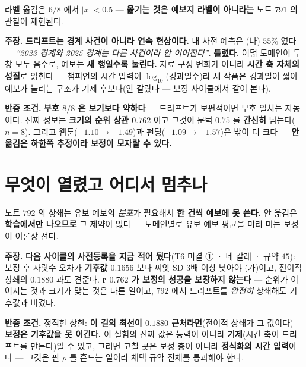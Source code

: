 \documentclass[10pt,a4paper]{article}
\newcommand{\claim}[2]{\begin{claimbox}\textbf{주장.} #1\par\smallskip
  \textcolor{gray!70}{\textbf{반증 조건.} #2}\end{claimbox}}
\begin{document}
라벨 옮김은 $6/8$ 에서 $|x| < 0.5$ --- \textbf{옮기는 것은 예보지 라벨이 아니라는}
노트 $791$ 의 관찰이 재현된다.

\claim{\textbf{드리프트는 경계 사건이 아니라 연속 현상이다.} 내 사전 예측은
(나) $55\%$ 였다 --- \emph{``2023 경계와 2025 경계는 다른 사건이라 안
이어진다''}. \textbf{틀렸다.} 여덟 도메인이 두 창 모두 음수로, 예보는
\textbf{새 행일수록 눌린다.} 자료 구성 변화가 아니라 \textbf{시간 축 자체의
성질}로 읽힌다 --- 챔피언의 시간 입력이 $\log_{10}$(경과일수)라 새 작품은
경과일이 짧아 예보가 눌리는 구조가 기제 후보다(안 갈랐다 --- 보정 사이클에서
같이 본다).}
{\textbf{부호 $8/8$ 은 보기보다 약하다} --- 드리프트가 보편적이면 부호 일치는
자동이다. 진짜 정보는 \textbf{크기의 순위 상관 $0.762$} 이고 그것이 문턱
$0.75$ 를 \textbf{간신히} 넘는다($n{=}8$). 그리고 웹툰($-1.10 \to -1.49$)과
펀딩($-1.09 \to -1.57$)은 밖이 더 크다 --- \textbf{안 옮김은 하한쪽 추정이라
보정이 모자랄 수 있다.}}

\section{무엇이 열렸고 어디서 멈추나}

노트 $792$ 의 상쇄는 유보 예보의 \emph{분포}가 필요해서 \textbf{한 건씩 예보에
못 쓴다.} 안 옮김은 \textbf{학습에서만 나오므로} 그 제약이 없다 --- 도메인별로
유보 예보 평균을 미리 미는 보정이 이론상 선다.

\claim{\textbf{다음 사이클의 사전등록을 지금 적어 뒀다}(T$6$ 미결 ① · 네 갈래 ·
규약 $45$): 보정 후 자릿수 오차가 \textbf{기후값 $0.1656$} 보다 씨앗 SD $3$배
이상 낮아야 (가)이고, 전이적 상쇄의 $0.1880$ 과도 견준다. \textbf{r $0.762$ 가
보정의 성공을 보장하지 않는다} --- 순위가 이어지는 것과 크기가 맞는 것은 다른
일이고, $792$ 에서 드리프트를 \emph{완전히} 상쇄해도 기후값과 비겼다.}
{정직한 상한: \textbf{이 길의 최선이 $0.1880$ 근처라면}(전이적 상쇄가 그 값이다)
\textbf{보정은 기후값을 못 이긴다.} 이 실험의 진짜 값은 능력이 아니라
\textbf{기제}(시간 축이 드리프트를 만든다)일 수 있고, 그러면 고칠 곳은 보정
층이 아니라 \textbf{정식화의 시간 입력}이다 --- 그것은 판 $\rho$ 를 흔드는
일이라 채택 규약 전체를 통과해야 한다.}
\end{document}
